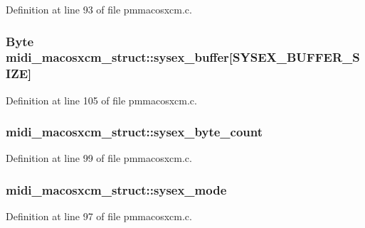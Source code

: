Definition at line 93 of file pmmacosxcm.\+c.

\subsubsection[{\texorpdfstring{sysex\+\_\+buffer}{sysex_buffer}}]{\setlength{\rightskip}{0pt plus 5cm}Byte midi\+\_\+macosxcm\+\_\+struct\+::sysex\+\_\+buffer\mbox{[}{\bf S\+Y\+S\+E\+X\+\_\+\+B\+U\+F\+F\+E\+R\+\_\+\+S\+I\+ZE}\mbox{]}}\hypertarget{structmidi__macosxcm__struct_a6fef1633a59357667e31d355a7a14939}{}\label{structmidi__macosxcm__struct_a6fef1633a59357667e31d355a7a14939}


Definition at line 105 of file pmmacosxcm.\+c.

\subsubsection[{\texorpdfstring{sysex\+\_\+byte\+\_\+count}{sysex_byte_count}}]{ midi\+\_\+macosxcm\+\_\+struct\+::sysex\+\_\+byte\+\_\+count}\hypertarget{structmidi__macosxcm__struct_a2c58a46f4a7c0f14c4c8b6c82806e1a8}{}\label{structmidi__macosxcm__struct_a2c58a46f4a7c0f14c4c8b6c82806e1a8}


Definition at line 99 of file pmmacosxcm.\+c.

\subsubsection[{\texorpdfstring{sysex\+\_\+mode}{sysex_mode}}]{ midi\+\_\+macosxcm\+\_\+struct\+::sysex\+\_\+mode}\hypertarget{structmidi__macosxcm__struct_a097c1c396255f76cbddcc4aef7d6b0de}{}\label{structmidi__macosxcm__struct_a097c1c396255f76cbddcc4aef7d6b0de}


Definition at line 97 of file pmmacosxcm.\+c.

